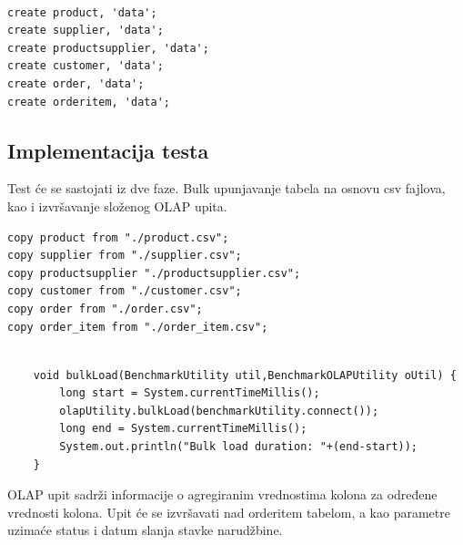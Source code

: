 \documentclass[12pt,oneside]{memoir}
\begin{document}

\begin{lstlisting}[title={hbase-setup-model},captionpos=t]

create product, 'data';
create supplier, 'data';
create productsupplier, 'data';
create customer, 'data';
create order, 'data';
create orderitem, 'data';

\end{lstlisting}

\subsection{Implementacija testa}

Test će se sastojati iz dve faze. Bulk upunjavanje tabela na osnovu csv fajlova, kao i izvršavanje složenog OLAP upita. 

\begin{lstlisting}[title={bulkLoad},captionpos=t]
copy product from "./product.csv";
copy supplier from "./supplier.csv";
copy productsupplier "./productsupplier.csv";
copy customer from "./customer.csv";
copy order from "./order.csv";
copy order_item from "./order_item.csv";
\end{lstlisting}


\begin{lstlisting}[title={BenchmarkExecutor.java},captionpos=t]

    void bulkLoad(BenchmarkUtility util,BenchmarkOLAPUtility oUtil) {
        long start = System.currentTimeMillis();
        olapUtility.bulkLoad(benchmarkUtility.connect());
        long end = System.currentTimeMillis();
        System.out.println("Bulk load duration: "+(end-start));
    }
\end{lstlisting}


OLAP upit sadrži informacije o agregiranim vrednostima kolona za određene vrednosti kolona. Upit će se izvršavati nad orderitem tabelom, a kao parametre uzimaće status i datum slanja stavke narudžbine.
\end{document}
